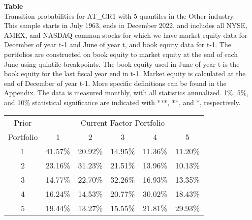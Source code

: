 \begin{table*}[ht!]
\raggedright
{}
\label{tab: transition_probs_AT_GR1_Other_with_5_quantiles}
\textbf{Table \thetable} \\
Transition probabilities for AT_GR1 with 5 quantiles in the Other industry. \\
\hspace*{1em}This sample starts in July 1963, ends in December 2022, and includes all NYSE, AMEX, and NASDAQ common stocks for which we have market equity data for December of year t-1 and June of year t, and book equity data for t-1. The portfolios are constructed on book equity to market equity at the end of each June using quintile breakpoints.  The book equity used in June of year t is the book equity for the last fiscal year end in t-1.  Market equity is calculated at the end of December of year t-1.  More specific definitions can be found in the Appendix.  The data is measured monthly, with all statistics annualized.  1\%, 5\%, and 10\% statistical significance are indicated with ***, **, and *, respectively. \\
\vspace{0.5em}
\centering
\begin{adjustbox}{max width=\textwidth}
\begin{tabular}{@{}cccccc@{}}
\toprule
Prior & \multicolumn{5}{c}{Current Factor Portfolio} \\
Portfolio & 1 & 2 & 3 & 4 & 5 \\
\midrule
1 & 41.57\% & 20.92\% & 14.95\% & 11.36\% & 11.20\% \\
2 & 23.16\% & 31.23\% & 21.51\% & 13.96\% & 10.13\% \\
3 & 14.77\% & 22.70\% & 32.26\% & 16.93\% & 13.35\% \\
4 & 16.24\% & 14.53\% & 20.77\% & 30.02\% & 18.43\% \\
5 & 19.44\% & 13.27\% & 15.55\% & 21.81\% & 29.93\% \\
\bottomrule
\end{tabular}
\end{adjustbox}
\end{table*}